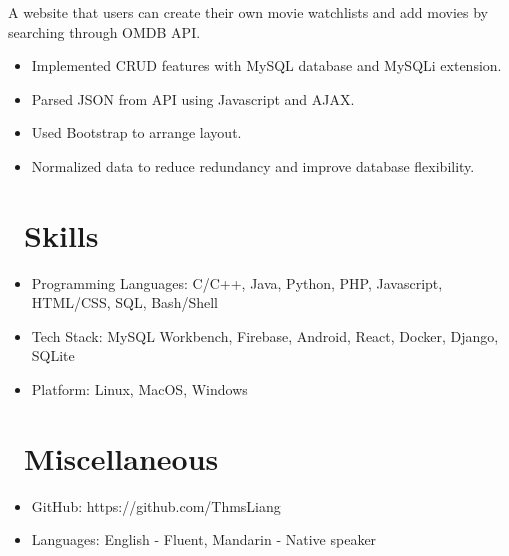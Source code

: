 \documentclass{resume}
\begin{document}
A website that users can create their own movie watchlists and add movies by searching through OMDB API.
\begin{itemize}
  \item Implemented CRUD features with MySQL database and MySQLi extension.
  \item Parsed JSON from API using Javascript and AJAX.
  \item Used Bootstrap to arrange layout.
  \item Normalized data to reduce redundancy and improve database flexibility.
\end{itemize}



\section{\faCogs\ Skills}
\begin{itemize}[parsep=0.5ex]
  \item Programming Languages: C/C++, Java, Python, PHP, Javascript, HTML/CSS, SQL, Bash/Shell
  \item Tech Stack: MySQL Workbench, Firebase, Android, React, Docker, Django, SQLite
  \item Platform: Linux, MacOS, Windows
\end{itemize}

\section{\faInfo\ Miscellaneous}
\begin{itemize}[parsep=0.5ex]
  \item GitHub: https://github.com/ThmsLiang
  \item Languages: English - Fluent, Mandarin - Native speaker
\end{itemize}

%
%
\end{document}
